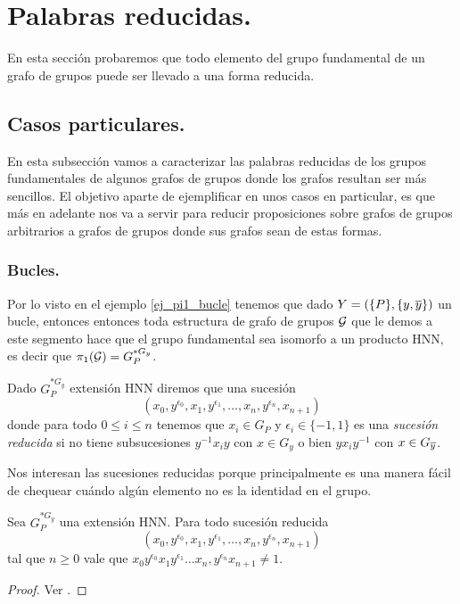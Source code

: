 \documentclass[tesis.tex]{subfiles}
\begin{document}
\section{Palabras reducidas.}\label{secc_palab_reds}

En esta sección probaremos que todo elemento del grupo fundamental de un grafo de grupos puede ser llevado a una forma reducida.

\subsection{Casos particulares.}

En esta subsección vamos a caracterizar las palabras reducidas de los grupos fundamentales de algunos grafos de grupos donde los grafos resultan ser más sencillos.
El objetivo aparte de ejemplificar en unos casos en particular, es que más en adelante nos va a servir para reducir proposiciones sobre grafos de grupos arbitrarios a grafos de grupos donde sus grafos sean de estas formas.

\subsubsection{Bucles.}\label{subsub_bucle}
Por lo visto en el ejemplo \ref{ej_pi1_bucle} tenemos que dado $Y = (\{P\}, \{y,\overline y\})$ un bucle, entonces entonces toda estructura de grafo de grupos ${\cal G}$ que le demos a este segmento 
hace que el grupo fundamental sea isomorfo a un producto HNN, es decir que $\pi_1({\cal G}) = G_P^{\ast G_y}$. 

\begin{deff}\label{deff_hnn_fn}
	Dado $G_P^{\ast G_y}$ extensión HNN diremos que una sucesión
	\[
		(x_{0},y^{\epsilon_0},x_{1},y^{\epsilon_1}, \dots, x_{n},y^{\epsilon_n},x_{n+1})
	\]
	donde para todo $0 \le i \le n$ tenemos que $x_{i} \in G_{P}$ y $\epsilon_{i} \in \{ -1,1 \}$
	es una \emph{sucesión reducida} si no tiene subsucesiones 
	$y^{-1}x_iy$ con $x \in G_{y}$ o bien $yx_iy^{-1}$ con $x \in G_{\overline y}$.	
\end{deff}

Nos interesan las sucesiones reducidas porque principalmente es una manera fácil de chequear cuándo algún elemento no es la identidad en el grupo.

\begin{prop}\label{teo_britton}
	Sea $G_P^{\ast G_y}$ una extensión HNN.
	Para todo sucesión reducida
	\[
	(x_{0},y^{\epsilon_0},x_{1},y^{\epsilon_1}, \dots, x_{n},y^{\epsilon_n},x_{n+1})
	\]
	tal que $n \ge 0$
	vale que $x_{0}y^{\epsilon_0}x_{1}y^{\epsilon_1} \dots x_{n},y^{\epsilon_n}x_{n+1} \neq 1$.
\end{prop}
\begin{proof}
	Ver \cite[p.182]{lyndon1977combinatorial}.
\end{proof}
\end{document}
